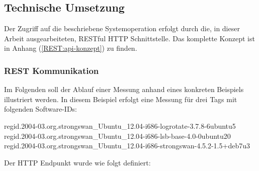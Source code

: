 \subsection{Technische Umsetzung}
Der Zugriff auf die beschriebene Systemoperation erfolgt durch die, in dieser
Arbeit ausgearbeiteten, RESTful HTTP Schnittstelle. Das komplette Konzept ist in
Anhang (\autoref{REST:api-konzept}) zu finden.

\subsubsection{REST Kommunikation}
Im Folgenden soll der Ablauf einer Messung anhand eines konkreten Beispiels
illustriert werden. In diesem Beispiel erfolgt eine Messung für drei Tags mit
folgenden Software-IDs:

\begin{textcode}
regid.2004-03.org.strongswan_Ubuntu_12.04-i686-logrotate-3.7.8-6ubuntu5
regid.2004-03.org.strongswan_Ubuntu_12.04-i686-lsb-base-4.0-0ubuntu20
regid.2004-03.org.strongswan_Ubuntu_12.04-i686-strongswan-4.5.2-1.5+deb7u3
\end{textcode}

Der HTTP Endpunkt wurde wie folgt definiert:

